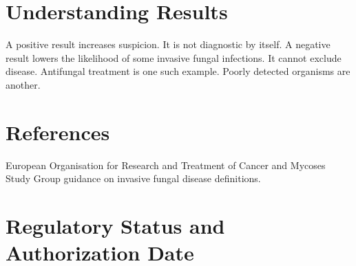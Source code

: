 \section*{Understanding Results}
A positive result increases suspicion.
It is not diagnostic by itself.
A negative result lowers the likelihood of some invasive fungal infections.
It cannot exclude disease.
Antifungal treatment is one such example.
Poorly detected organisms are another.

\section*{References}
European Organisation for Research and Treatment of Cancer and Mycoses Study Group guidance on invasive fungal disease definitions.

\clearpage


\section*{Regulatory Status and Authorization Date}

\clearpage
